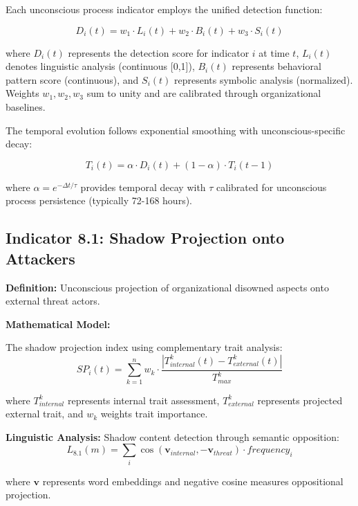 \documentclass[11pt,a4paper]{article}
\begin{document}
Each unconscious process indicator employs the unified detection function:

\begin{equation}
D_i(t) = w_1 \cdot L_i(t) + w_2 \cdot B_i(t) + w_3 \cdot S_i(t)
\end{equation}

where $D_i(t)$ represents the detection score for indicator $i$ at time $t$, $L_i(t)$ denotes linguistic analysis (continuous [0,1]), $B_i(t)$ represents behavioral pattern score (continuous), and $S_i(t)$ represents symbolic analysis (normalized). Weights $w_1, w_2, w_3$ sum to unity and are calibrated through organizational baselines.

The temporal evolution follows exponential smoothing with unconscious-specific decay:

\begin{equation}
T_i(t) = \alpha \cdot D_i(t) + (1-\alpha) \cdot T_i(t-1)
\end{equation}

where $\alpha = e^{-\Delta t/\tau}$ provides temporal decay with $\tau$ calibrated for unconscious process persistence (typically 72-168 hours).

\subsection{Indicator 8.1: Shadow Projection onto Attackers}

\textbf{Definition:} Unconscious projection of organizational disowned aspects onto external threat actors.

\textbf{Mathematical Model:}

The shadow projection index using complementary trait analysis:
\begin{equation}
SP_i(t) = \sum_{k=1}^{n} w_k \cdot \frac{|T_{internal}^k(t) - T_{external}^k(t)|}{T_{max}^k}
\end{equation}

where $T_{internal}^k$ represents internal trait assessment, $T_{external}^k$ represents projected external trait, and $w_k$ weights trait importance.

\textbf{Linguistic Analysis:}
Shadow content detection through semantic opposition:
\begin{equation}
L_{8.1}(m) = \sum_{i} \cos(\mathbf{v}_{internal}, -\mathbf{v}_{threat}) \cdot frequency_i
\end{equation}

where $\mathbf{v}$ represents word embeddings and negative cosine measures oppositional projection.
\end{document}
